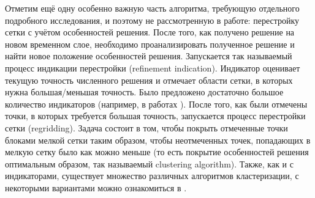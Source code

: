 Отметим ещё одну особенно важную часть алгоритма, требующую отдельного подробного исследования, и поэтому не рассмотренную в работе: перестройку сетки с учётом особенностей решения.
После того, как получено решение на новом временном слое, необходимо проанализировать полученное решение и найти новое положение особенностей решения.
Запускается так называемый процесс индикации перестройки (refinement indication).
Индикатор оценивает текущую точность численного решения и отмечает области сетки, в которых нужна большая/меньшая точность.
Было предложено достаточно большое количество индикаторов (например, в работах \cite{berger1989local, berger1982adaptive, lohner1987adaptive}).
После того, как были отмечены точки, в которых требуется большая точность, запускается процесс перестройки сетки (regridding).
Задача состоит в том, чтобы покрыть отмеченные точки блоками мелкой сетки таким образом, чтобы неотмеченных точек, попадающих в мелкую сетку было как можно меньше (то есть покрытие особенностей решения оптимальным образом, так называемый clustering algorithm).
Также, как и с индикаторами, существует множество различных алгоритмов кластеризации, с некоторыми вариантами можно ознакомиться в \cite{berger1989local, deiterding2011block}.